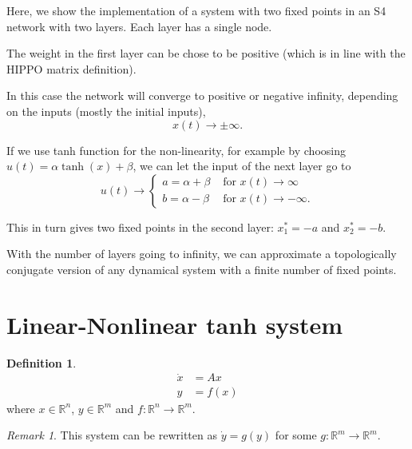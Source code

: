 \documentclass{article}
\title{}
\author{\'Abel S\'agodi}
\date{April 1, 2023}
\theoremstyle{definition}
\newtheorem{definition}{Definition}
\theoremstyle{remark}
\newtheorem{remark}{Remark}
\begin{document}
\maketitle

Here, we show the implementation of a system with two fixed points in an S4 network with two layers.
Each layer has a single node.

The weight in the first layer can be chose to be positive (which is in line with the HIPPO matrix definition).

In this case the network will converge to positive or negative infinity, depending on the inputs (mostly the initial inputs),
\[x(t) \rightarrow \pm \infty.\]

If we use  tanh function for the non-linearity,
for example by choosing $u(t) = \alpha\tanh(x) + \beta$,
we can let the input of the next layer go to 
\begin{equation}
u(t) \rightarrow
\begin{cases}
a = \alpha + \beta & \text{ for }  x(t)\rightarrow \infty\\
b = \alpha - \beta& \text{ for }  x(t)\rightarrow -\infty.
\end{cases}
\end{equation}

This in turn gives two fixed points in the second layer: $x_1^*=-a$ and $x_2^*=-b$.



\begin{conjecture}\label{universality}
With the number of layers going to infinity, we can approximate a topologically conjugate version of any dynamical system with a finite number of fixed points. 
\end{conjecture}


\section{Linear-Nonlinear tanh system}

\begin{definition}
\begin{align}
\dot x &= Ax\\
       y &= f(x)
\end{align}
where $x\in\mathbb{R}^n$, $y\in\mathbb{R}^m$ and $f\colon \mathbb{R}^n\rightarrow\mathbb{R}^m$.
\end{definition}

\begin{remark}
This system can be rewritten as $\dot y = g(y)$ for some $g\colon\mathbb{R}^m\rightarrow\mathbb{R}^m$.
\end{remark}
\end{document}

